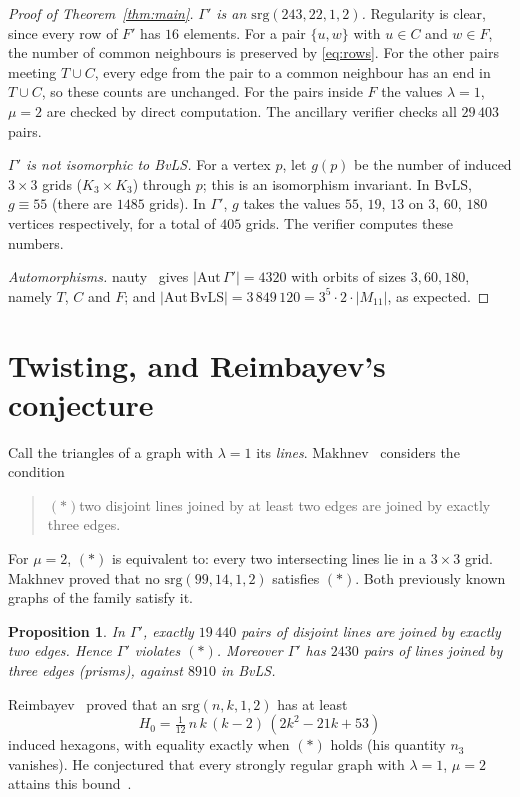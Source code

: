 \documentclass[11pt]{amsart}
\newtheorem{proposition}[theorem]{Proposition}
\theoremstyle{remark}
\begin{document}
\begin{proof}[Proof of Theorem~\ref{thm:main}]
\emph{$\Gamma'$ is an $\mathrm{srg}(243,22,1,2)$.} Regularity is clear, since every row of $F'$ has $16$ elements.
For a pair $\{u,w\}$ with $u\in C$ and $w\in F$, the number of common neighbours is preserved by
\eqref{eq:rows}. For the other pairs meeting $T\cup C$, every edge from the pair to a common neighbour has an end in
$T\cup C$, so these counts are unchanged. For the
pairs inside $F$ the values $\lambda=1$, $\mu=2$ are checked by direct computation. The ancillary verifier checks
all $29\,403$ pairs.

\emph{$\Gamma'$ is not isomorphic to BvLS.} For a vertex $p$, let $g(p)$ be the number of induced $3\times3$ grids
($K_3\times K_3$) through $p$; this is an isomorphism invariant. In BvLS, $g\equiv55$ (there are $1485$ grids). In
$\Gamma'$, $g$ takes the values $55$, $19$, $13$ on $3$, $60$, $180$ vertices respectively, for a total of $405$
grids. The verifier computes these numbers.

\emph{Automorphisms.} nauty~\cite{nauty} gives $|\mathrm{Aut}\,\Gamma'|=4320$ with orbits of sizes $3,60,180$, namely
$T$, $C$ and $F$; and $|\mathrm{Aut}\,\mathrm{BvLS}|=3\,849\,120=3^5\cdot2\cdot|M_{11}|$, as expected.
\end{proof}

\section{Twisting, and Reimbayev's conjecture}
Call the triangles of a graph with $\lambda=1$ its \emph{lines}. Makhnev~\cite{Mak} considers the condition
\begin{quote}
$(*)$\quad two disjoint lines joined by at least two edges are joined by exactly three edges.
\end{quote}
For $\mu=2$, $(*)$ is equivalent to: every two intersecting lines lie in a $3\times3$ grid. Makhnev proved that no
$\mathrm{srg}(99,14,1,2)$ satisfies $(*)$. Both previously known graphs of the family satisfy it.

\begin{proposition}\label{prop:twist}
In $\Gamma'$, exactly $19\,440$ pairs of disjoint lines are joined by exactly two edges. Hence $\Gamma'$ violates $(*)$.
Moreover $\Gamma'$ has $2430$ pairs of lines joined by three edges (prisms), against $8910$ in BvLS.
\end{proposition}

Reimbayev~\cite{Rei} proved that an $\mathrm{srg}(n,k,1,2)$ has at least
\[
H_0=\tfrac1{12}\,n\,k\,(k-2)\,(2k^2-21k+53)
\]
induced hexagons, with equality exactly when $(*)$ holds (his quantity $n_3$ vanishes). He conjectured that every strongly
regular graph with $\lambda=1$, $\mu=2$ attains this bound~\cite[\S4]{Rei}.
\end{document}
